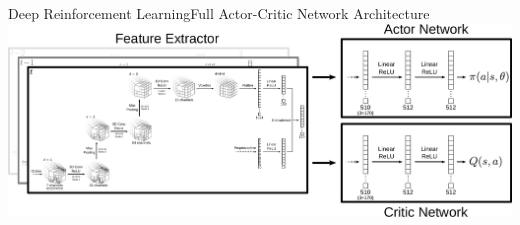 \begin{frame}{Deep Reinforcement Learning}{Full Actor-Critic Network Architecture}
    \centering
    \includegraphics[width=\textwidth]{graphics/actor_critic_network_full.pdf}
\end{frame}



